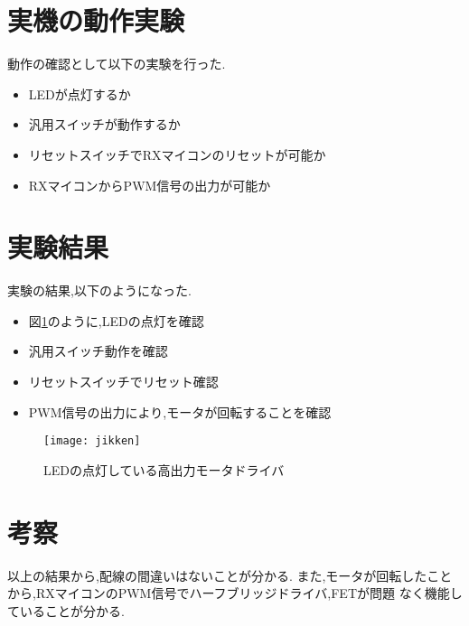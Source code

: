 \section{実機の動作実験}
動作の確認として以下の実験を行った.
\begin{itemize}
\item LEDが点灯するか
\item 汎用スイッチが動作するか
\item リセットスイッチでRXマイコンのリセットが可能か
\item RXマイコンからPWM信号の出力が可能か
\end{itemize}

\section{実験結果}
実験の結果,以下のようになった.
\begin{itemize}
\item 図\ref{fig:jikken}のように,LEDの点灯を確認
\item 汎用スイッチ動作を確認
\item リセットスイッチでリセット確認
\item PWM信号の出力により,モータが回転することを確認
\end{itemize}
\begin{figure}[H]
\begin{center}
\texttt{[image: jikken]}
\end{center}
\caption{LEDの点灯している高出力モータドライバ}
\label{fig:jikken}
\end{figure}

\section{考察}
以上の結果から,配線の間違いはないことが分かる.
また,モータが回転したことから,RXマイコンのPWM信号でハーフブリッジドライバ,FETが問題
なく機能していることが分かる.
